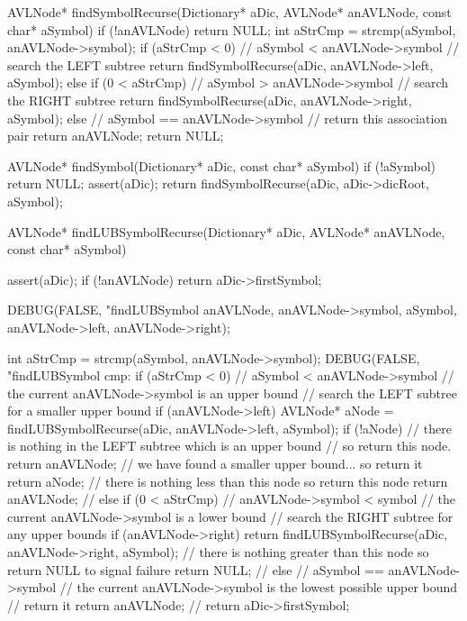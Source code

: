 AVLNode* findSymbolRecurse(Dictionary* aDic,
                           AVLNode* anAVLNode,
                           const char* aSymbol) {
  if (!anAVLNode) return NULL;
  int aStrCmp = strcmp(aSymbol, anAVLNode->symbol);
  if (aStrCmp < 0) {
    // aSymbol < anAVLNode->symbol // search the LEFT subtree
    return findSymbolRecurse(aDic, anAVLNode->left, aSymbol);
  } else if (0 < aStrCmp) {
    // aSymbol > anAVLNode->symbol // search the RIGHT subtree
    return findSymbolRecurse(aDic, anAVLNode->right, aSymbol);
  } else {
    // aSymbol == anAVLNode->symbol // return this association pair
    return anAVLNode;
  }
  return NULL;
}

AVLNode* findSymbol(Dictionary* aDic, const char* aSymbol) {
  if (!aSymbol) return NULL;
  assert(aDic);
  return findSymbolRecurse(aDic, aDic->dicRoot, aSymbol);
}

AVLNode* findLUBSymbolRecurse(Dictionary* aDic,
                              AVLNode* anAVLNode,
                              const char* aSymbol) {
  assert(aDic);
  if (!anAVLNode) return aDic->firstSymbol;

  DEBUG(FALSE, "findLUBSymbol %
        anAVLNode, anAVLNode->symbol, aSymbol,
        anAVLNode->left, anAVLNode->right);

  int aStrCmp = strcmp(aSymbol, anAVLNode->symbol);
  DEBUG(FALSE, "findLUBSymbol cmp: %
  if (aStrCmp < 0) {
    // aSymbol < anAVLNode->symbol
    // the current anAVLNode->symbol is an upper bound
    // search the LEFT subtree for a smaller upper bound
    if (anAVLNode->left) {
      AVLNode* aNode = findLUBSymbolRecurse(aDic, anAVLNode->left, aSymbol);
      if (!aNode) {
        // there is nothing in the LEFT subtree which is an upper bound
        // so return this node.
        return anAVLNode;
      }
      // we have found a smaller upper bound... so return it
      return aNode;
    }
    // there is nothing less than this node so return this node
    return anAVLNode;
    //
  } else if (0 < aStrCmp) {
    // anAVLNode->symbol < symbol
    // the current anAVLNode->symbol is a lower bound
    // search the RIGHT subtree for any upper bounds
    if (anAVLNode->right) {
      return findLUBSymbolRecurse(aDic, anAVLNode->right, aSymbol);
    }
    // there is nothing greater than this node so return NULL to signal failure
    return NULL;
    //
  } else {
    // aSymbol == anAVLNode->symbol
    // the current anAVLNode->symbol is the lowest possible upper bound
    // return it
    return anAVLNode;
    //
  }
  return aDic->firstSymbol;
}

